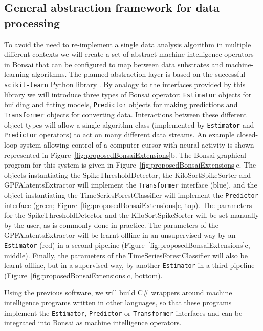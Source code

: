\subsection{General abstraction framework for data processing}
\label{sec:generality}

To avoid the need to re-implement a single data analysis algorithm in multiple different contexts we will create a set of abstract machine-intelligence operators in Bonsai that can be configured to map between data substrates and machine-learning algorithms.
%
The planned abstraction layer is based on the successful \texttt{scikit-learn} Python
library \citep{buitinckEtAl13}.
%
By analogy to the interfaces provided by this library we will introduce three types of Bonsai operator: \texttt{Estimator} objects for building and fitting models, \texttt{Predictor} objects for making predictions and \texttt{Transformer} objects for converting data.
%
Interactions between these different object types will allow a single algorithm class (implemented by \texttt{Estimator} and \texttt{Predictor} operators) to act on many different data streams.
%
An example closed-loop system allowing  control of a computer cursor with neural activity is shown represented in
Figure~\ref{fig:proposedBonsaiExtensions}b. The Bonsai
graphical program for this system is given in
Figure~\ref{fig:proposedBonsaiExtensions}c. The
objects instantiating the SpikeThresholdDetector, the KiloSortSpikeSorter and
GPFAlatentsExtractor will implement the \texttt{Transformer} interface (blue),
and the object instantiating the TimeSeriesForestClassifier will implement the
\texttt{Predictor} interface (green; Figure~\ref{fig:proposedBonsaiExtensions}c, top).
%
The parameters for the SpikeThresholdDetector and the KiloSortSpikeSorter will
be set manually by the user, as is commonly done in practice. The parameters of
the GPFAlatentsExtractor will be learnt offline in an unsupervised way by an
\texttt{Estimator} (red) in a second pipeline
(Figure~\ref{fig:proposedBonsaiExtensions}c, middle).
Finally, the parameters of the TimeSeriesForestClassifier will also be learnt
offline, but in a supervised way, by another \texttt{Estimator} in a third
pipeline (Figure~\ref{fig:proposedBonsaiExtensions}c, bottom).


Using the previous software, we will build C\# wrappers around machine
intelligence programs written in other languages, so that these programs
implement the \texttt{Estimator}, \texttt{Predictor} or \texttt{Transformer}
interfaces and can be integrated into Bonsai as machine intelligence operators.

